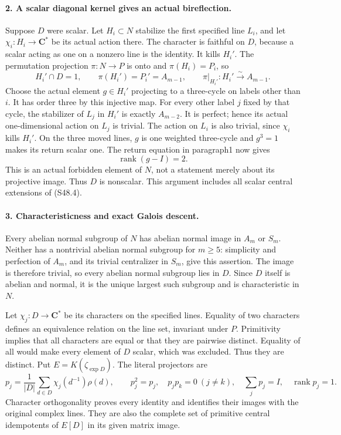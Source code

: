 \paragraph{2. A scalar diagonal kernel gives an actual bireflection.}
Suppose \(D\) were scalar. Let \(H_i\subset N\)
stabilize the first specified line \(L_i\), and let
\(\chi_i:H_i\to\mathbf C^*\) be its actual action there.
The character is faithful on \(D\), because a scalar acting
as one on a nonzero line is the identity. It kills \(H_i'\).
The permutation projection \(\pi:N\to P\) is onto and
\(\pi(H_i)=P_i\), so
\[
 H_i'\cap D=1,\qquad
 \pi(H_i')=P_i'=A_{m-1},\qquad
          \pi|_{H_i'}:H_i'\xrightarrow{\sim}A_{m-1}.
 \tag{S48.5}
\]
Choose the actual element \(g\in H_i'\) projecting to a
three-cycle on labels other than \(i\). It has order three
by this injective map. For every other label \(j\) fixed
by that cycle, the stabilizer of \(L_j\) in \(H_i'\)
is exactly \(A_{m-2}\). It is perfect; hence its actual
one-dimensional action on \(L_j\) is trivial. The action
on \(L_i\) is also trivial, since \(\chi_i\) kills
\(H_i'\). On the three moved lines, \(g\) is one
weighted three-cycle and \(g^3=1\) makes its return scalar
one. The return equation in paragraph1 now gives
\[
                            \operatorname{rank}(g-I)=2.
 \tag{S48.6}
\]
This is an actual forbidden element of \(N\), not a
statement merely about its projective image. Thus \(D\)
is nonscalar. This argument includes all scalar central
extensions of (S48.4).

\paragraph{3. Characteristicness and exact Galois descent.}
Every abelian normal subgroup of \(N\) has abelian normal
image in \(A_m\) or \(S_m\). Neither has a nontrivial
abelian normal subgroup for \(m\ge5\): simplicity and
perfection of \(A_m\), and its trivial centralizer in
\(S_m\), give this assertion. The image is therefore
trivial, so every abelian normal subgroup lies in \(D\).
Since \(D\) itself is abelian and normal, it is the unique
largest such subgroup and is characteristic in \(N\).

Let \(\chi_j:D\to\mathbf C^*\) be its characters on
the specified lines. Equality of two characters defines an
equivalence relation on the line set, invariant under \(P\).
Primitivity implies that all characters are equal or that
they are pairwise distinct. Equality of all would make every
element of \(D\) scalar, which was excluded. Thus they are
distinct. Put \(E=K(\zeta_{\exp D})\). The literal
projectors are
\[
 p_j=\frac1{|D|}\sum_{d\in D}\chi_j(d^{-1})\rho(d),
 \qquad p_j^2=p_j,\quad p_jp_k=0\ (j\ne k),
 \quad\sum_jp_j=I,\quad\operatorname{rank}p_j=1.
 \tag{S48.7}
\]
Character orthogonality proves every identity and identifies
their images with the original complex lines. They are also
the complete set of primitive central idempotents of
\(E[D]\) in its given matrix image.

